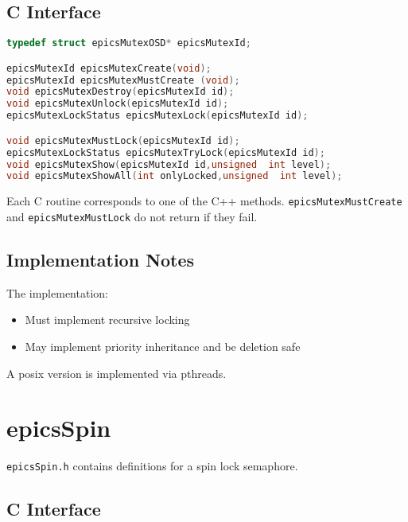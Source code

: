 \subsection{C Interface}

\begin{lstlisting}[language=C]
typedef struct epicsMutexOSD* epicsMutexId;

epicsMutexId epicsMutexCreate(void);
epicsMutexId epicsMutexMustCreate (void);
void epicsMutexDestroy(epicsMutexId id);
void epicsMutexUnlock(epicsMutexId id);
epicsMutexLockStatus epicsMutexLock(epicsMutexId id);

void epicsMutexMustLock(epicsMutexId id);
epicsMutexLockStatus epicsMutexTryLock(epicsMutexId id);
void epicsMutexShow(epicsMutexId id,unsigned  int level);
void epicsMutexShowAll(int onlyLocked,unsigned  int level);
\end{lstlisting}

Each C routine corresponds to one of the C++ methods. \verb|epicsMutexMustCreate| and \verb|epicsMutexMustLock| do 
not return if they fail.

\subsection{Implementation Notes}

The implementation:

\begin{itemize}
\item Must implement recursive locking

\item May implement priority inheritance and be deletion safe

\end{itemize}

A posix version is implemented via pthreads.


\section{epicsSpin}

\verb|epicsSpin.h| contains definitions for a spin lock semaphore.

\subsection{C Interface}


